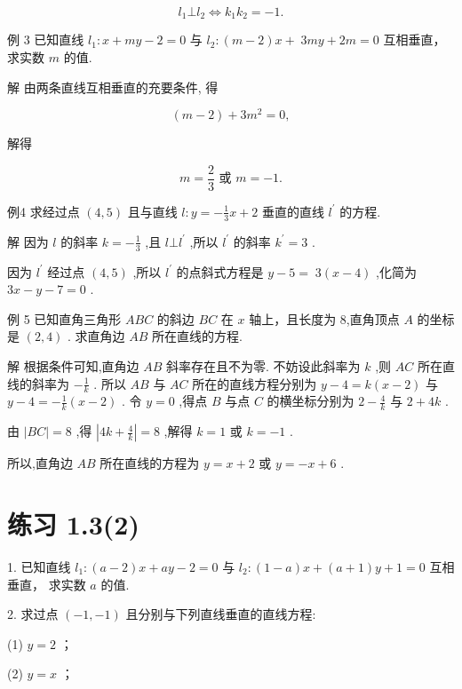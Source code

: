 \documentclass[10pt]{article}
\begin{document}
\[
{l}_{1} \bot  {l}_{2} \Leftrightarrow  {k}_{1}{k}_{2} =  - 1.
\]

例 3 已知直线 \({l}_{1} : x + {my} - 2 = 0\) 与 \({l}_{2} : \left( {m - 2}\right) x + \; {3my} + {2m} = 0\) 互相垂直，求实数 \(m\) 的值.

解 由两条直线互相垂直的充要条件, 得

\[
\left( {m - 2}\right)  + 3{m}^{2} = 0,
\]

解得

\[
m = \frac{2}{3}\text{ 或 }m =  - 1.
\]

例4 求经过点 \(\left( {4,5}\right)\) 且与直线 \(l : y =  - \frac{1}{3}x + 2\) 垂直的直线 \({l}^{\prime }\) 的方程.

解 因为 \(l\) 的斜率 \(k =  - \frac{1}{3}\) ,且 \(l \bot  {l}^{\prime }\) ,所以 \({l}^{\prime }\) 的斜率 \({k}^{\prime } = 3\) .

因为 \({l}^{\prime }\) 经过点 \(\left( {4,5}\right)\) ,所以 \({l}^{\prime }\) 的点斜式方程是 \(y - 5 = \; 3\left( {x - 4}\right)\) ,化简为 \({3x} - y - 7 = 0\) .

例 5 已知直角三角形 \({ABC}\) 的斜边 \({BC}\) 在 \(x\) 轴上，且长度为 8,直角顶点 \(A\) 的坐标是 \(\left( {2,4}\right)\) . 求直角边 \({AB}\) 所在直线的方程.

解 根据条件可知,直角边 \({AB}\) 斜率存在且不为零. 不妨设此斜率为 \(k\) ,则 \({AC}\) 所在直线的斜率为 \(- \frac{1}{k}\) . 所以 \({AB}\) 与 \({AC}\) 所在的直线方程分别为 \(y - 4 = k\left( {x - 2}\right)\) 与 \(y - 4 =  - \frac{1}{k}\left( {x - 2}\right)\) . 令 \(y = 0\) ,得点 \(B\) 与点 \(C\) 的横坐标分别为 \(2 - \frac{4}{k}\) 与 \(2 + {4k}\) .

由 \(\left| {BC}\right|  = 8\) ,得 \(\left| {{4k} + \frac{4}{k}}\right|  = 8\) ,解得 \(k = 1\) 或 \(k =  - 1\) .

所以,直角边 \({AB}\) 所在直线的方程为 \(y = x + 2\) 或 \(y =  - x + 6\) .

\section*{练习 1.3(2)}

1. 已知直线 \({l}_{1} : \left( {a - 2}\right) x + {ay} - 2 = 0\) 与 \({l}_{2} : \left( {1 - a}\right) x + \left( {a + 1}\right) y + 1 = 0\) 互相垂直， 求实数 \(a\) 的值.

2. 求过点 \(\left( {-1, - 1}\right)\) 且分别与下列直线垂直的直线方程:

(1) \(y = 2\) ；

(2) \(y = x\) ；
\end{document}

